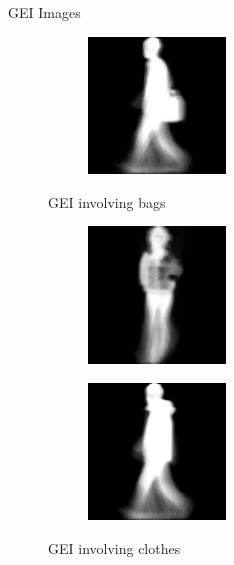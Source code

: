 \documentclass[xcolor=dvipsnames]{beamer}
\begin{document}
\begin{frame}{GEI Images}
\begin{figure}[!h]
\begin{subfigure}{0.3\textwidth}
        \label{fig:img1}
    \end{subfigure}
    \begin{subfigure}{0.3\textwidth}
        \centering
        \includegraphics[width=0.4\textwidth]{walk-bg2.jpg}
        
        \label{fig:img2}
    \end{subfigure}
    \caption{GEI involving bags}
  \end{figure}


  \begin{figure}[!h]
    \centering
    \begin{subfigure}{0.3\textwidth}
        \centering
        \includegraphics[width=0.4\textwidth]{walk-cl1.jpg}
        
        \label{fig:img1}
    \end{subfigure}
    \begin{subfigure}{0.3\textwidth}
        \centering
        \includegraphics[width=0.4\textwidth]{walk-cl2.jpg}
        
        \label{fig:img2}
    \end{subfigure}
    \caption{GEI involving clothes}
  \end{figure}
    
\end{frame}
\end{document}
